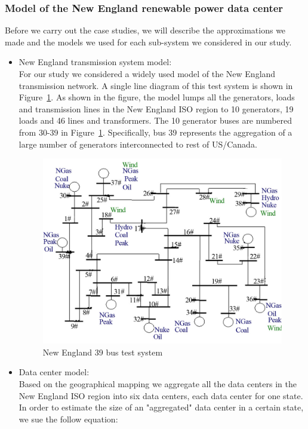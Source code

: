 \subsubsection{Model of the New England renewable power data center}
Before we carry out the case studies, we will describe the approximations we made and the models we used for each sub-system we considered in our study.
\begin{itemize}
\item{New England transmission system model: \\
For our study we considered a widely used  \cite{bills1970line} model of the New England transmission network. A single line diagram of this test system is shown in Figure~\ref{fig:newengland}. As shown in the figure, the model lumps all the generators, loads and transmission lines in the New England ISO region to 10 generators, 19 loads and 46 lines and transformers. The 10 generator buses are numbered from 30-39 in Figure~\ref{fig:newengland}. Specifically, bus 39 represents the aggregation of a large number of generators interconnected to rest of US/Canada.

\begin{figure}[ht]
\centering
\includegraphics[width=1\columnwidth]{img/newEngland.jpg}
\caption{New England 39 bus test system}
\label{fig:newengland}
\end{figure}
}

\item{Data center model: \\
Based on the geographical mapping we aggregate all the data centers in the New England ISO region into six data centers, each data center for one state. In order to estimate the size of an "aggregated" data center in a certain state, we sue the follow equation:

}
\end{itemize}
